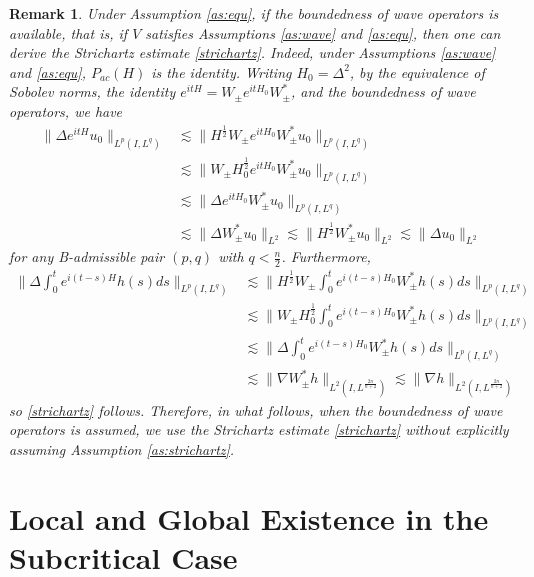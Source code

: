 \documentclass[11pt,a4paper]{article}
\numberwithin{equation}{section}
\newtheorem{remark}{Remark}[section]
\begin{document}
\begin{remark}
Under Assumption \ref{as:equ}, if the boundedness of wave operators is available, that is, if $V$ satisfies Assumptions \ref{as:wave} and \ref{as:equ}, then one can derive the Strichartz estimate \eqref{strichartz}. Indeed, under Assumptions \ref{as:wave} and \ref{as:equ}, $P_{ac}(H)$ is the identity. Writing $H_{0} = \Delta^{2}$, by the equivalence of Sobolev norms, the identity $e^{itH} = W_{\pm}e^{itH_{0}}W_{\pm}^{*}$, and the boundedness of wave operators, we have
\begin{align*}
\|\Delta e^{itH}u_{0}\|_{L^{p}(I, L^{q})} &\lesssim \|H^{\frac{1}{2}}W_{\pm}e^{itH_{0}}W_{\pm}^{*}u_{0}\|_{L^{p}(I, L^{q})} \\
&\lesssim \|W_{\pm}H_{0}^{\frac{1}{2}}e^{itH_{0}}W_{\pm}^{*}u_{0}\|_{L^{p}(I, L^{q})} \\
&\lesssim \|\Delta e^{itH_{0}}W_{\pm}^{*}u_{0}\|_{L^{p}(I, L^{q})} \\
&\lesssim \|\Delta W_{\pm}^{*}u_{0}\|_{L^{2}} \lesssim \|H^{\frac{1}{2}}  W_{\pm}^{*} u_{0}\|_{L^{2}} \lesssim \|\Delta u_{0}\|_{L^{2}}
\end{align*}
for any B-admissible pair $(p, q)$ with $q < \frac{n}{2}$. Furthermore,
\begin{align*}
\|\Delta \int_{0}^{t}e^{i(t-s)H}h(s)ds\|_{L^{p}(I, L^{q})} &\lesssim \|H^{\frac{1}{2}}W_{\pm}\int_{0}^{t}e^{i(t-s)H_{0}}W_{\pm}^{*}h(s)ds\|_{L^{p}(I, L^{q})} \\
&\lesssim  \|W_{\pm}H^{\frac{1}{2}}_{0}\int_{0}^{t}e^{i(t-s)H_{0}}W_{\pm}^{*}h(s)ds\|_{L^{p}(I, L^{q})} \\
&\lesssim \|\Delta \int_{0}^{t}e^{i(t-s)H_{0}}W_{\pm}^{*}h(s)ds\|_{L^{p}(I, L^{q})}\\
&\lesssim \|\nabla W_{\pm}^{*}h\|_{L^{2}(I, L^{\frac{2n}{n+2}})} \lesssim \|\nabla h\|_{L^{2}(I, L^{\frac{2n}{n+2}})}
\end{align*}
so \eqref{strichartz} follows. Therefore, in what follows, when the boundedness of wave operators is assumed, we use the Strichartz estimate \eqref{strichartz} without explicitly assuming Assumption \ref{as:strichartz}.
\end{remark}

\section{Local and Global Existence in the Subcritical Case}
\end{document}
